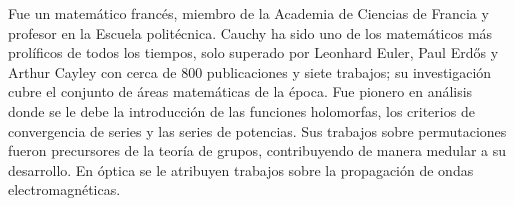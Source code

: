 \begin{parchment}{Fue un matemático francés, miembro de la Academia de Ciencias de Francia y profesor en la Escuela politécnica.
Cauchy ha sido uno de los matemáticos más prolíficos de todos los tiempos, solo superado por Leonhard Euler, Paul Erdős y Arthur Cayley con cerca de 800 publicaciones y siete trabajos; su investigación cubre el conjunto de áreas matemáticas de la época. Fue pionero en análisis donde se le debe la introducción de las funciones holomorfas, los criterios de convergencia de series y las series de potencias. Sus trabajos sobre permutaciones fueron precursores de la teoría de grupos, contribuyendo de manera medular a su desarrollo. En óptica se le atribuyen trabajos sobre la propagación de ondas electromagnéticas. \cite{Cauchy}}
\end{parchment}



\bigskip

